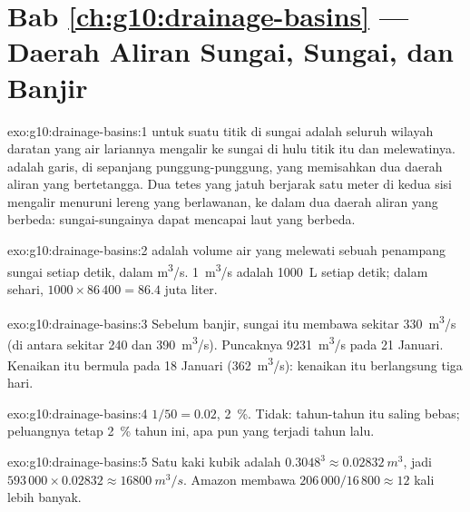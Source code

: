 \section*{Bab \ref{ch:g10:drainage-basins} --- Daerah Aliran Sungai, Sungai, dan Banjir}

\begin{solution}{exo:g10:drainage-basins:1}
 untuk suatu titik di sungai adalah seluruh wilayah
daratan yang air lariannya mengalir ke sungai di hulu titik itu dan
melewatinya.  adalah garis, di sepanjang punggung-punggung,
yang memisahkan dua daerah aliran yang bertetangga. Dua tetes yang jatuh
berjarak satu meter di kedua sisi  mengalir menuruni lereng
yang berlawanan, ke dalam dua daerah aliran yang berbeda: sungai-sungainya
dapat mencapai laut yang berbeda.
\end{solution}

\begin{solution}{exo:g10:drainage-basins:2}
 adalah volume air yang melewati sebuah penampang sungai setiap detik,
dalam \unit{m^3/s}. \qty{1}{m^3/s} adalah \qty{1000}{L} setiap detik; dalam
sehari, $1000 \times 86\,400 = 86.4$ juta liter.
\end{solution}

\begin{solution}{exo:g10:drainage-basins:3}
Sebelum banjir, sungai itu membawa sekitar \qty{330}{m^3/s} (di antara
sekitar \num{240} dan \qty{390}{m^3/s}). Puncaknya \qty{9231}{m^3/s} pada
21 Januari. Kenaikan itu bermula pada 18 Januari (\qty{362}{m^3/s}): kenaikan
itu berlangsung tiga hari.
\end{solution}

\begin{solution}{exo:g10:drainage-basins:4}
$1/50 = 0.02$, \qty{2}{\percent}. Tidak: tahun-tahun itu saling bebas;
peluangnya tetap \qty{2}{\percent} tahun ini, apa pun yang terjadi tahun lalu.
\end{solution}

\begin{solution}{exo:g10:drainage-basins:5}
Satu kaki kubik adalah $0.3048^3 \approx \qty{0.02832}{m^3}$, jadi
$593\,000 \times 0.02832 \approx \qty{16800}{m^3/s}$. Amazon membawa
$206\,000/16\,800 \approx 12$ kali lebih banyak.
\end{solution}


